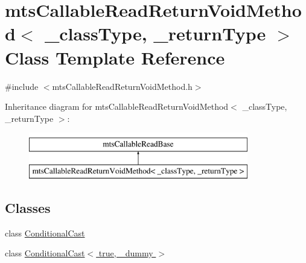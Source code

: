 \hypertarget{classmts_callable_read_return_void_method}{\section{mts\-Callable\-Read\-Return\-Void\-Method$<$ \-\_\-class\-Type, \-\_\-return\-Type $>$ Class Template Reference}
\label{classmts_callable_read_return_void_method}
}


{\ttfamily \#include $<$mts\-Callable\-Read\-Return\-Void\-Method.\-h$>$}

Inheritance diagram for mts\-Callable\-Read\-Return\-Void\-Method$<$ \-\_\-class\-Type, \-\_\-return\-Type $>$\-:\begin{figure}[H]
\begin{center}
\leavevmode
\includegraphics[height=2.000000cm]{d0/d8b/classmts_callable_read_return_void_method}
\end{center}
\end{figure}
\subsection*{Classes}
\begin{DoxyCompactItemize}
\item 
class \hyperlink{classmts_callable_read_return_void_method_1_1_conditional_cast}{Conditional\-Cast}
\item 
class \hyperlink{classmts_callable_read_return_void_method_1_1_conditional_cast_3_01true_00_01__dummy_01_4}{Conditional\-Cast$<$ true, \-\_\-dummy $>$}
\end{DoxyCompactItemize}
